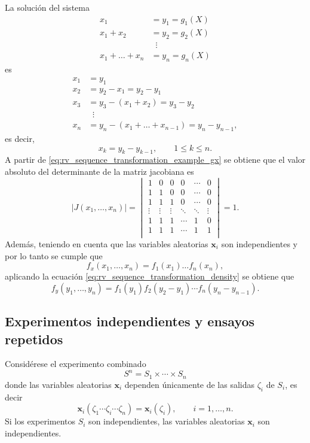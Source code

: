 \documentclass[a4paper]{report}
\newcommand{\x}{\mathbf{x}}
\begin{document}
La solución del sistema
\begin{equation}\label{eq:rv_sequence_transformation_example_gx}
 \begin{aligned}
 x_1&=y_1=g_1(X)\\
 x_1+x_2&=y_2=g_2(X)\\
 &\;\;\vdots\\
 x_1+\dots+x_n&=y_n=g_n(X)
\end{aligned}
\end{equation}
es
\begin{align*}
 x_1&=y_1\\
 x_2&=y_2-x_1=y_2-y_1\\
 x_3&=y_3-(x_1+x_2)=y_3-y_2\\
 &\;\;\vdots\\
 x_n&=y_n-(x_1+\dots+x_{n-1})=y_n-y_{n-1},
\end{align*}
es decir,
\[
 x_k=y_k-y_{k-1},\qquad 1\leq k\leq n.
\]
A partir de \ref{eq:rv_sequence_transformation_example_gx} se obtiene que el valor absoluto del determinante de la matriz jacobiana es
\[
 |J(x_1,\dots,x_n)|=
 \begin{vmatrix}
    1 & 0 & 0 & 0 & \cdots & 0\\
    1 & 1 & 0 & 0 & \cdots & 0\\
    1 & 1 & 1 & 0 & \cdots & 0\\
    \vdots & \vdots & \vdots &  \ddots & \ddots & \vdots\\
    1 & 1 & 1 & \cdots & 1 & 0\\
    1 & 1 & 1 & \cdots & 1 & 1\\
\end{vmatrix}
=1.
\]
Además, teniendo en cuenta que las variables aleatorias \(\x_i\) son independientes y por lo tanto se cumple que
\[
 f_x(x_1,\dots,x_n)=f_1(x_1)\dots f_n(x_n),
\]
aplicando la ecuación \ref{eq:rv_sequence_transformation_density} se obtiene que
\[
 f_y(y_1,\dots,y_n)=f_1(y_1)f_2(y_2-y_1)\cdots f_n(y_n-y_{n-1}).
\]

\subsection{Experimentos independientes y ensayos repetidos}

Considérese el experimento combinado
\[
 S^n=S_1\times\cdots\times S_n
\]
donde las variables aleatorias \(\x_i\) dependen únicamente de las salidas \(\zeta_i\) de \(S_i\), es decir
\[
 \x_i(\zeta_1\cdots\zeta_i\cdots\zeta_n)=\x_i(\zeta_i),\qquad i=1,\dots,n.
\]
Si los experimentos \(S_i\) son independientes, las variables aleatorias \(\x_i\) son independientes.
\end{document}
